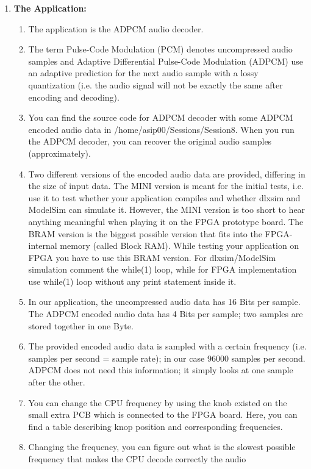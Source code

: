 \begin{enumerate}
\item \textbf{The Application:}
	\begin{enumerate}
		\item
		The application is the ADPCM audio decoder.
		\item
		The term Pulse-Code Modulation (PCM) denotes uncompressed audio
		samples and Adaptive Differential Pulse-Code Modulation (ADPCM) use
		an adaptive prediction for the next audio sample with a lossy
		quantization (i.e. the audio signal will not be exactly the same
		after encoding and decoding).
		\item
		You can find the source code for ADPCM decoder with some ADPCM
		encoded audio data in /home/asip00/Sessions/Session8. When you run
		the ADPCM decoder, you can recover the original audio samples
		(approximately).
		\item
		Two different versions of the encoded audio data are provided,
		differing in the size of input data. The MINI version is meant for
		the initial tests, i.e. use it to test whether your application
		compiles and whether dlxsim and ModelSim can simulate it. However,
		the MINI version is too short to hear anything meaningful when
		playing it on the FPGA prototype board. The BRAM version is the
		biggest possible version that fits into the FPGA-internal memory
		(called Block RAM). While testing your application on FPGA you have
		to use this BRAM version. For dlxsim/ModelSim simulation comment the
		while(1) loop, while for FPGA implementation use while(1) loop
		without any print statement inside it.
		\item
		In our application, the uncompressed audio data has 16 Bits per
		sample. The ADPCM encoded audio data has 4 Bits per sample; two
		samples are stored together in one Byte.
		\item
		The provided encoded audio data is sampled with a certain frequency
		(i.e. samples per second = sample rate); in our case 96000 samples
		per second. ADPCM does not need this information; it simply looks at
		one sample after the other.
		\item
		You can change the CPU frequency by using the knob existed on the
		small extra PCB which is connected to the FPGA board. Here, you can
		find a table describing knop position and corresponding frequencies.
		\item
		Changing the frequency, you can figure out what is the slowest
		possible frequency that makes the CPU decode correctly the audio

\end{enumerate}
\end{enumerate}
